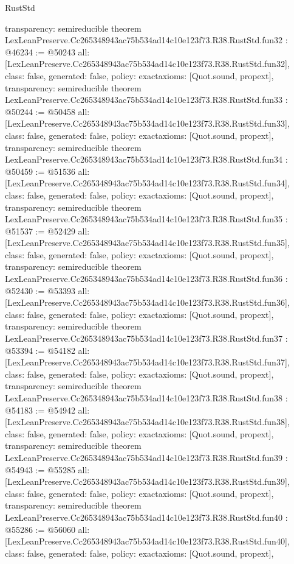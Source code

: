 \begin{lexlean}{RustStd}
\begin{coremodule}
{  transparency: semireducible
}
theorem LexLeanPreserve.Cc265348943ac75b534ad14c10e123f73.R38.RustStd.fun32 : @46234 := @50243 {
  all: [LexLeanPreserve.Cc265348943ac75b534ad14c10e123f73.R38.RustStd.fun32],
  class: false,
  generated: false,
  policy: exact{axioms: [Quot.sound, propext]},
  transparency: semireducible
}
theorem LexLeanPreserve.Cc265348943ac75b534ad14c10e123f73.R38.RustStd.fun33 : @50244 := @50458 {
  all: [LexLeanPreserve.Cc265348943ac75b534ad14c10e123f73.R38.RustStd.fun33],
  class: false,
  generated: false,
  policy: exact{axioms: [Quot.sound, propext]},
  transparency: semireducible
}
theorem LexLeanPreserve.Cc265348943ac75b534ad14c10e123f73.R38.RustStd.fun34 : @50459 := @51536 {
  all: [LexLeanPreserve.Cc265348943ac75b534ad14c10e123f73.R38.RustStd.fun34],
  class: false,
  generated: false,
  policy: exact{axioms: [Quot.sound, propext]},
  transparency: semireducible
}
theorem LexLeanPreserve.Cc265348943ac75b534ad14c10e123f73.R38.RustStd.fun35 : @51537 := @52429 {
  all: [LexLeanPreserve.Cc265348943ac75b534ad14c10e123f73.R38.RustStd.fun35],
  class: false,
  generated: false,
  policy: exact{axioms: [Quot.sound, propext]},
  transparency: semireducible
}
theorem LexLeanPreserve.Cc265348943ac75b534ad14c10e123f73.R38.RustStd.fun36 : @52430 := @53393 {
  all: [LexLeanPreserve.Cc265348943ac75b534ad14c10e123f73.R38.RustStd.fun36],
  class: false,
  generated: false,
  policy: exact{axioms: [Quot.sound, propext]},
  transparency: semireducible
}
theorem LexLeanPreserve.Cc265348943ac75b534ad14c10e123f73.R38.RustStd.fun37 : @53394 := @54182 {
  all: [LexLeanPreserve.Cc265348943ac75b534ad14c10e123f73.R38.RustStd.fun37],
  class: false,
  generated: false,
  policy: exact{axioms: [Quot.sound, propext]},
  transparency: semireducible
}
theorem LexLeanPreserve.Cc265348943ac75b534ad14c10e123f73.R38.RustStd.fun38 : @54183 := @54942 {
  all: [LexLeanPreserve.Cc265348943ac75b534ad14c10e123f73.R38.RustStd.fun38],
  class: false,
  generated: false,
  policy: exact{axioms: [Quot.sound, propext]},
  transparency: semireducible
}
theorem LexLeanPreserve.Cc265348943ac75b534ad14c10e123f73.R38.RustStd.fun39 : @54943 := @55285 {
  all: [LexLeanPreserve.Cc265348943ac75b534ad14c10e123f73.R38.RustStd.fun39],
  class: false,
  generated: false,
  policy: exact{axioms: [Quot.sound, propext]},
  transparency: semireducible
}
theorem LexLeanPreserve.Cc265348943ac75b534ad14c10e123f73.R38.RustStd.fun40 : @55286 := @56060 {
  all: [LexLeanPreserve.Cc265348943ac75b534ad14c10e123f73.R38.RustStd.fun40],
  class: false,
  generated: false,
  policy: exact{axioms: [Quot.sound, propext]},
}
\end{coremodule}
\end{lexlean}
